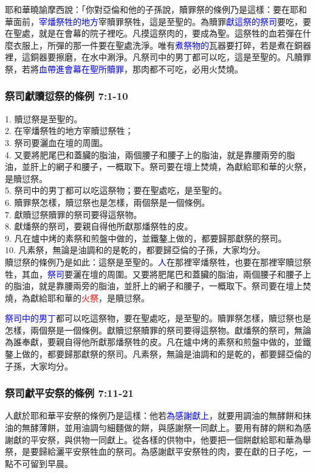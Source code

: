 耶和華曉諭摩西說：「你對亞倫和他的子孫說，贖罪祭的條例乃是這樣：要在耶和華面前，\textcolor{blue}{宰燔祭牲的地方}宰贖罪祭牲，這是至聖的。為贖罪\textcolor{blue}{獻這祭的祭司}要吃，要在聖處，就是在會幕的院子裡吃。凡摸這祭肉的，要成為聖。這祭牲的血若彈在什麼衣服上，所彈的那一件要在聖處洗淨。唯有\textcolor{blue}{煮祭物的}瓦器要打碎，若是煮在銅器裡，這銅器要擦磨，在水中涮淨。凡祭司中的男丁都可以吃，這是至聖的。凡贖罪祭，若將\textcolor{blue}{血帶進會幕在聖所贖罪}，那肉都不可吃，必用火焚燒。    

\subsubsection{祭司獻贖愆祭的條例 7:1-10}
1. 贖愆祭是至聖的。\\
2. 在宰燔祭牲的地方宰贖愆祭牲；\\
3. 祭司要灑血在壇的周圍。\\
4. 又要將肥尾巴和蓋臟的脂油，兩個腰子和腰子上的脂油，就是靠腰兩旁的脂油，並肝上的網子和腰子，一概取下。祭司要在壇上焚燒，為獻給耶和華的火祭，是贖愆祭。\\
5. 祭司中的男丁都可以吃這祭物；要在聖處吃，是至聖的。\\
6. 贖罪祭怎樣，贖愆祭也是怎樣，兩個祭是一個條例。\\
7. 獻贖愆祭贖罪的祭司要得這祭物。\\
8. 獻燔祭的祭司，要親自得他所獻那燔祭牲的皮。\\
9. 凡在爐中烤的素祭和煎盤中做的，並鐵鏊上做的，都要歸那獻祭的祭司。\\
10. 凡素祭，無論是油調和的是乾的，都要歸亞倫的子孫，大家均分。\\
   

贖愆祭的條例乃是如此：這祭是至聖的。\textcolor{blue}{人}在那裡宰燔祭牲，也要在那裡宰贖愆祭牲，其血，\textcolor{blue}{祭司}要灑在壇的周圍。又要將肥尾巴和蓋臟的脂油，兩個腰子和腰子上的脂油，就是靠腰兩旁的脂油，並肝上的網子和腰子，一概取下。祭司要在壇上焚燒，為獻給耶和華的\textcolor{red}{火祭}，是贖愆祭。

\textcolor{blue}{祭司中的男丁}都可以吃這祭物，要在聖處吃，是至聖的。贖罪祭怎樣，贖愆祭也是怎樣，兩個祭是一個條例。獻贖愆祭贖罪的祭司要得這祭物。獻燔祭的祭司，無論為誰奉獻，要親自得他所獻那燔祭牲的皮。凡在爐中烤的素祭和煎盤中做的，並鐵鏊上做的，都要歸那獻祭的祭司。凡素祭，無論是油調和的是乾的，都要歸亞倫的子孫，大家均分。

\subsubsection{祭司獻平安祭的條例 7:11-21}
人獻於耶和華平安祭的條例乃是這樣：他若\textcolor{blue}{為感謝獻上}，就要用調油的無酵餅和抹油的無酵薄餅，並用油調勻細麵做的餅，與感謝祭一同獻上。要用有酵的餅和為感謝獻的平安祭，與供物一同獻上。從各樣的供物中，他要把一個餅獻給耶和華為舉祭，是要歸給灑平安祭牲血的祭司。為感謝獻平安祭牲的肉，要在獻的日子吃，一點不可留到早晨。 

